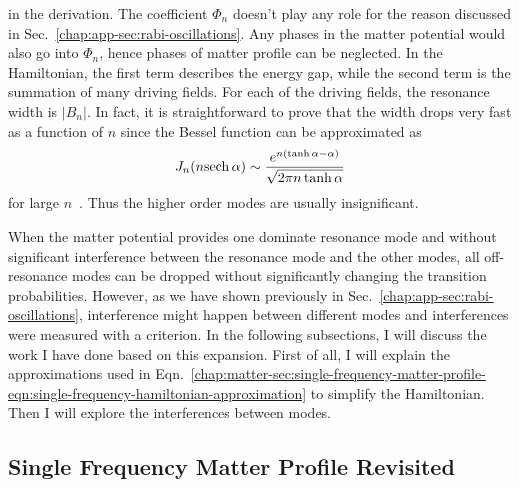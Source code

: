 in the derivation.
The coefficient $\Phi_n$ doesn't play any role for the reason discussed in Sec.~\ref{chap:app-sec:rabi-oscillations}. Any phases in the matter potential would also go into $\Phi_n$, hence phases of matter profile can be neglected. In the Hamiltonian, the first term describes the energy gap, while the second term is the summation of many driving fields. For each of the driving fields, the resonance width is $\lvert B_{n}\rvert$. In fact, it is straightforward to prove that the width drops very fast as a function of $n$ since the Bessel function can be approximated as
\begin{equation}
J_n(n {\operatorname{sech}{\alpha}}) \sim \frac{ e^{n(\tanh\alpha - \alpha)} }{\sqrt{ 2\pi n \tanh \alpha } }
\end{equation}
for large $n$~\cite{Ploumistakis20092897}. Thus the higher order modes are usually insignificant.


When the matter potential provides one dominate resonance mode and without significant interference between the resonance mode and the other modes, all off-resonance modes can be dropped without significantly changing the transition probabilities. However, as we have shown previously in Sec.~\ref{chap:app-sec:rabi-oscillations}, interference might happen between different modes and interferences were measured with a criterion. In the following subsections, I will discuss the work I have done based on this expansion. First of all, I will explain the approximations used in Eqn.~\ref{chap:matter-sec:single-frequency-matter-profile-eqn:single-frequency-hamiltonian-approximation} to simplify the Hamiltonian. Then I will explore the interferences between modes. 



\subsection{Single Frequency Matter Profile Revisited}

